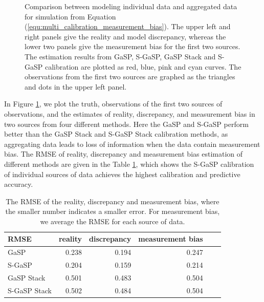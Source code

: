 \begin{figure}[t]
\begin{tabular}{cc}
\end{tabular}
\vspace{-.2in}
   \caption{Comparison between modeling individual data and aggregated data for simulation from  Equation (\ref{equ:multi_calibration_measurement_bias}).  The upper left and right panels give the reality and model discrepancy, whereas the lower two panels give the measurement bias for the first two sources. The estimation results from GaSP, S-GaSP,  GaSP Stack and S-GaSP calibration are plotted as  red, blue, pink and cyan curves. The observations from the first two sources are graphed as the triangles and dots in the upper left panel.  }
 \label{fig:multicalibration_eg}
\end{figure}


In Figure \ref{fig:multicalibration_eg}, we plot the truth, observations of the first two sources of observations, and the estimates of reality, discrepancy, and  measurement bias in two sources from four different methods. Here the GaSP and S-GaSP perform better than the GaSP Stack and S-GaSP Stack calibration methods, as aggregating data leads to loss of information when the data contain measurement bias. The RMSE of reality, discrepancy and measurement bias estimation  of different  methods are given in the Table \ref{tab:prediction_multicalibration}, {which shows the S-GaSP calibration of individual sources of data achieves the highest calibration and predictive accuracy}. 


\begin{table}[t]
\begin{center}
\begin{tabular}{lrrrrr}
  \hline
 RMSE&  reality & discrepancy &  measurement bias  \\
  \hline
  GaSP           &{0.238}&0.194 &{0.247}   \\
  S-GaSP           &{0.204}& 0.159&{0.214}   \\
  GaSP Stack           &{0.501}&0.483&{0.504}   \\
  S-GaSP Stack         &0.502& 0.484&  {0.504} \\ 
  \hline
\end{tabular}
\end{center}
   \caption{The RMSE of the reality, discrepancy and measurement bias, where the smaller number indicates a smaller error. For  measurement bias, we average the RMSE for each source of data.  }

   \label{tab:prediction_multicalibration}
\end{table}

